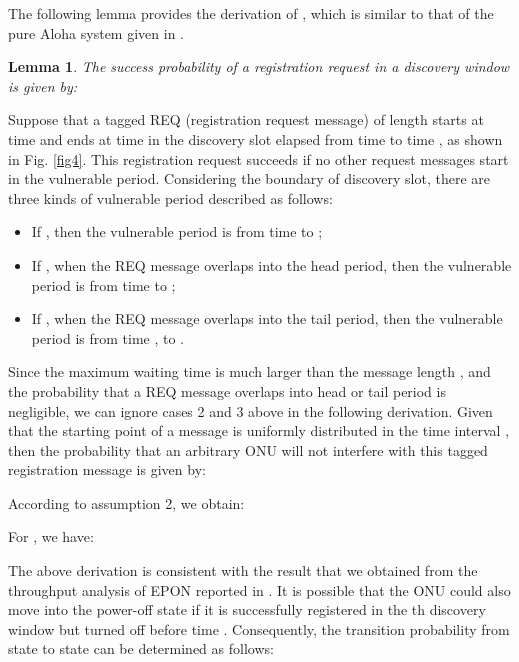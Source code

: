 \documentclass[journal]{IEEEtran}
\newtheorem{lemma}{\textbf{Lemma}}
\begin{document}
The following lemma provides the derivation of ,  which is similar to that of the pure Aloha system given in \cite{21Abramson}.
\begin{lemma}\label{lemma1}
  The success probability of a registration request in a discovery window is given by:
    
\end{lemma}
\begin{IEEEproof}
Suppose that a tagged REQ (registration request message) of length  starts at time  and ends at time  in the discovery slot elapsed from time  to time , as shown in Fig. \ref{fig4}. This registration request succeeds if no other request messages start in the vulnerable period. Considering the boundary of discovery slot, there are three kinds of vulnerable period described as follows:
\begin{itemize}
  \item [1)] If , then the vulnerable period is from time  to ;
  \item [2)] If , when the REQ message overlaps into the head period, then the vulnerable period is from time  to ;
  \item [3)] If , 	when the REQ message overlaps into the tail period, then the vulnerable period is from time , to .
\end{itemize}


Since the maximum waiting time  is much larger than the message length , and the probability that a REQ message overlaps into head or tail period is negligible, we can ignore cases 2 and 3 above in the following derivation. Given that the starting point of a message is uniformly distributed in the time interval , then the probability  that an arbitrary ONU will not interfere with this tagged registration message is given by:

According to assumption 2, we obtain:

For , we have:

\end{IEEEproof}






The above derivation is consistent with the result that we obtained from the throughput analysis of EPON reported in \cite{9cui2012throughput}. It is possible that the ONU could also move into the power-off state  if it is successfully registered in the th discovery window but turned off before time . Consequently, the transition probability  from state  to state  can be determined as follows:
\end{document}
